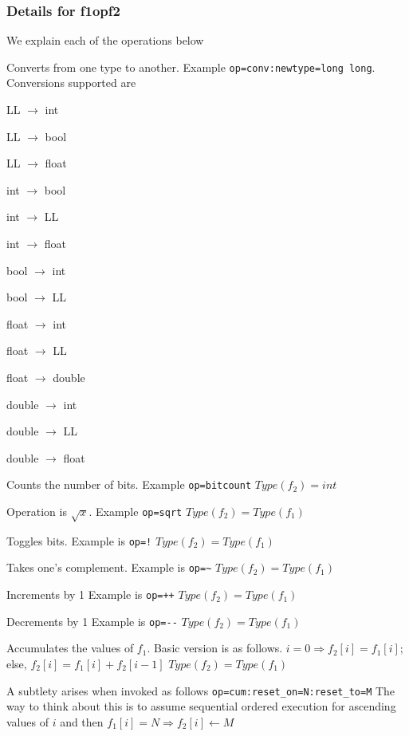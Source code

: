 \subsubsection{Details for f1opf2}
\label{details_f1opf2}
We explain each of the operations below
\bd
\item [CONV] Converts from one type to another. Example
\verb+op=conv:newtype=long long+. Conversions supported
are
\be
\item LL \(\rightarrow\) int
\item LL \(\rightarrow\) bool
\item LL \(\rightarrow\) float
\item int \(\rightarrow\) bool
\item int \(\rightarrow\) LL
\item int \(\rightarrow\) float
\item bool \(\rightarrow\) int
\item bool \(\rightarrow\) LL
\item float \(\rightarrow\) int
\item float \(\rightarrow\) LL
\item float \(\rightarrow\) double
\item double \(\rightarrow\) int
\item double \(\rightarrow\) LL
\item double \(\rightarrow\) float
\ee
\item [BITCOUNT] 
Counts the number of bits.
Example \verb+op=bitcount+
\(Type(f_2) = int\)
\item [SQRT] 
Operation is \(\sqrt{x}\). 
Example \verb+op=sqrt+
\(Type(f_2) = Type(f_1)\)
\item [NEGATION] Toggles bits. 
Example is \verb+op=!+
\(Type(f_2) = Type(f_1)\)
\item [ONE's COMPLEMENT] 
Takes one's complement. 
Example is \verb+op=~+
\(Type(f_2) = Type(f_1)\)
\item [INCREMENT]
Increments by 1
Example is \verb~op=++~
\(Type(f_2) = Type(f_1)\)
\item [DECREMENT]
Decrements by 1
Example is \verb~op=--~
\(Type(f_2) = Type(f_1)\)
\item [CUM] 
Accumulates the values of \(f_1\). Basic version is as follows.
\(i = 0 \Rightarrow f_2[i] = f_1[i]\); else, \(f_2[i] = f_1[i] + f_2[i-1]\)
\(Type(f_2) = Type(f_1)\)

A subtlety arises when invoked as follows
\verb+op=cum:reset_on=N:reset_to=M+ The way to think about this is to
assume sequential ordered execution for ascending values of \(i\) and
then \(f_1[i] = N \Rightarrow f_2[i] \leftarrow M\)

